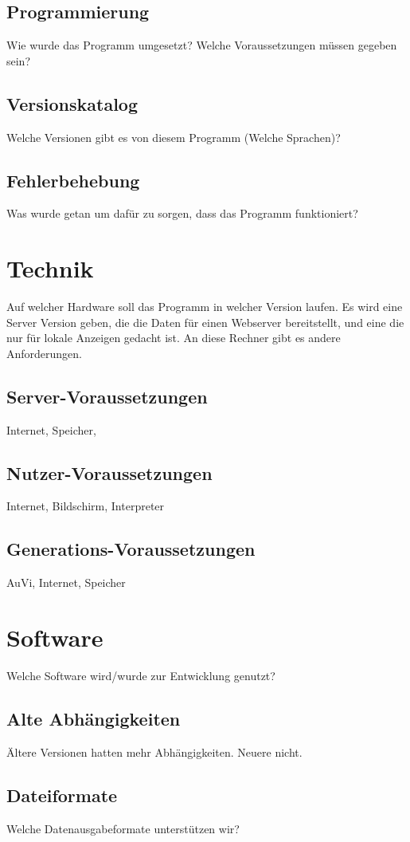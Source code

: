 \documentclass[a4paper,oneside,10pt,titlepage]{article}
\begin{document}
\subsection{Programmierung}
Wie wurde das Programm umgesetzt? Welche Voraussetzungen müssen gegeben sein?
\subsection{Versionskatalog}
Welche Versionen gibt es von diesem Programm (Welche Sprachen)?
\subsection{Fehlerbehebung}
Was wurde getan um dafür zu sorgen, dass das Programm funktioniert?
\section{Technik}
Auf welcher Hardware soll das Programm in welcher Version laufen. Es wird eine Server Version geben, die die Daten für einen Webserver bereitstellt, und eine die nur für lokale Anzeigen gedacht ist. An diese Rechner gibt es andere Anforderungen.
\subsection{Server-Voraussetzungen}
Internet, Speicher,
\subsection{Nutzer-Voraussetzungen}
Internet, Bildschirm, Interpreter
\subsection{Generations-Voraussetzungen}
AuVi, Internet, Speicher
\section{Software}
Welche Software wird/wurde zur Entwicklung genutzt?
\subsection{Alte Abhängigkeiten}
Ältere Versionen hatten mehr Abhängigkeiten. Neuere nicht.
\subsection{Dateiformate}
Welche Datenausgabeformate unterstützen wir?
\end{document}
